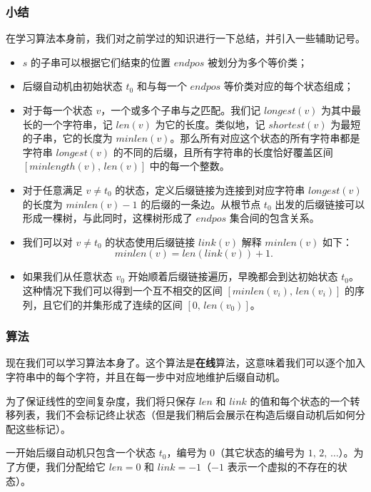 \subsubsection{小结}

在学习算法本身前，我们对之前学过的知识进行一下总结，并引入一些辅助记号。

\begin{itemize}
\item
  \(s\) 的子串可以根据它们结束的位置 \(endpos\) 被划分为多个等价类；
\item
  后缀自动机由初始状态 \(t_0\) 和与每一个 \(endpos\)
  等价类对应的每个状态组成；
\item
  对于每一个状态 \(v\)，一个或多个子串与之匹配。我们记 \(longest(v)\)
  为其中最长的一个字符串，记 \(len(v)\) 为它的长度。类似地，记
  \(shortest(v)\) 为最短的子串，它的长度为
  \(minlen(v)\)。那么所有对应这个状态的所有字符串都是字符串
  \(longest(v)\) 的不同的后缀，且所有字符串的长度恰好覆盖区间
  \([minlength(v),\,len(v)]\) 中的每一个整数。
\item
  对于任意满足 \(v\ne t_0\) 的状态，定义后缀链接为连接到对应字符串
  \(longest(v)\) 的长度为 \(minlen(v)-1\) 的后缀的一条边。从根节点
  \(t_0\) 出发的后缀链接可以形成一棵树，与此同时，这棵树形成了
  \(endpos\) 集合间的包含关系。
\item
  我们可以对 \(v\ne t_0\) 的状态使用后缀链接 \(link(v)\) 解释
  \(minlen(v)\) 如下：
\[
minlen(v)=len(link(v))+1.
\]
\item
  如果我们从任意状态 \(v_0\) 开始顺着后缀链接遍历，早晚都会到达初始状态
  \(t_0\)。这种情况下我们可以得到一个互不相交的区间
  \([minlen(v_i),\,len(v_i)]\) 的序列，且它们的并集形成了连续的区间
  \([0,\,len(v_0)]\)。
\end{itemize}

\subsubsection{算法}

现在我们可以学习算法本身了。这个算法是\textbf{在线}算法，这意味着我们可以逐个加入字符串中的每个字符，并且在每一步中对应地维护后缀自动机。

为了保证线性的空间复杂度，我们将只保存 \(len\) 和 \(link\)
的值和每个状态的一个转移列表，我们不会标记终止状态（但是我们稍后会展示在构造后缀自动机后如何分配这些标记）。

一开始后缀自动机只包含一个状态 \(t_0\)，编号为 \(0\)（其它状态的编号为
\(1,\,2,\,\ldots\)）。为了方便，我们分配给它 \(len=0\) 和
\(link=-1\)（\(-1\) 表示一个虚拟的不存在的状态）。

